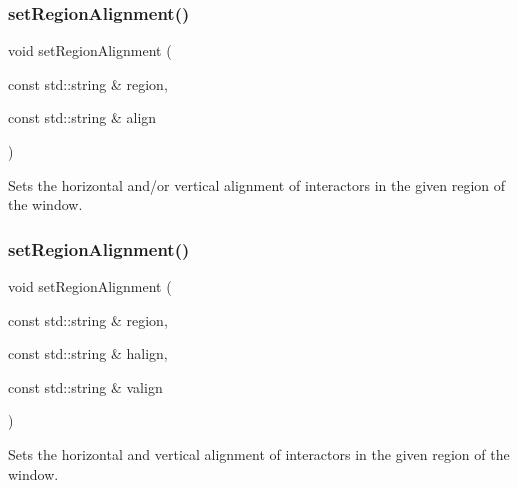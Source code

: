\subsubsection{\texorpdfstring{set\+Region\+Alignment()}{setRegionAlignment()}\hspace{0.1cm}{\footnotesize\ttfamily [4/5]}}
{\footnotesize\ttfamily void set\+Region\+Alignment (\begin{DoxyParamCaption}\item[{const std\+::string \&}]{region,  }\item[{const std\+::string \&}]{align }\end{DoxyParamCaption})\hspace{0.3cm}{\ttfamily [virtual]}}



Sets the horizontal and/or vertical alignment of interactors in the given region of the window. 

\mbox{\label{classGWindow_ad1c76be81b3b865f78b0e91f0e1f07d4}} 
\subsubsection{\texorpdfstring{set\+Region\+Alignment()}{setRegionAlignment()}\hspace{0.1cm}{\footnotesize\ttfamily [5/5]}}
{\footnotesize\ttfamily void set\+Region\+Alignment (\begin{DoxyParamCaption}\item[{const std\+::string \&}]{region,  }\item[{const std\+::string \&}]{halign,  }\item[{const std\+::string \&}]{valign }\end{DoxyParamCaption})\hspace{0.3cm}{\ttfamily [virtual]}}



Sets the horizontal and vertical alignment of interactors in the given region of the window. 

\mbox{\label{classGWindow_aca8f01ef261afca9c843589e8be54134}} 
